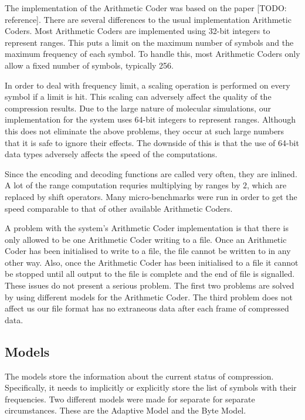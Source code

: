 \documentclass[a4paper,11pt]{report}
\begin{document}
The implementation of the Arithmetic Coder was based on the paper [TODO: reference]. There are several differences to the usual implementation Arithmetic Coders. Most Arithmetic Coders are implemented using 32-bit integers to represent ranges. This puts a limit on the maximum number of symbols and the maximum frequency of each symbol. To handle this, most Arithmetic Coders only allow a fixed number of symbols, typically 256. 

In order to deal with frequency limit, a scaling operation is performed on every symbol if a limit is hit. This scaling can adversely affect the quality of the compression results. Due to the large nature of molecular simulations, our implementation for the system uses 64-bit integers to represent ranges. Although this does not eliminate the above problems, they occur at such large numbers that it is safe to ignore their effects. The downside of this is that the use of 64-bit data types adversely affects the speed of the computations. 

Since the encoding and decoding functions are called very often, they are inlined. A lot of the range computation requries multiplying by ranges by $2$, which are replaced by shift operators. Many micro-benchmarks were run in order to get the speed comparable to that of other available Arithmetic Coders.

A problem with the system's Arithmetic Coder implementation is that there is only allowed to be one Arithmetic Coder writing to a file. Once an Arithmetic Coder has been initialised to write to a file, the file cannot be written to in any other way. Also, once the Arithmetic Coder has been initialised to a file it cannot be stopped until all output to the file is complete and the end of file is signalled. These issues do not present a serious problem. The first two problems are solved by using different models for the Arithmetic Coder. The third problem does not affect us our file format has no extraneous data after each frame of compressed data.

\subsection{Models}

The models store the information about the current status of compression. Specifically, it needs to implicitly or explicitly store the list of symbols with their frequencies. Two different models were made for separate for separate circumstances. These are the Adaptive Model and the Byte Model.
\end{document}
